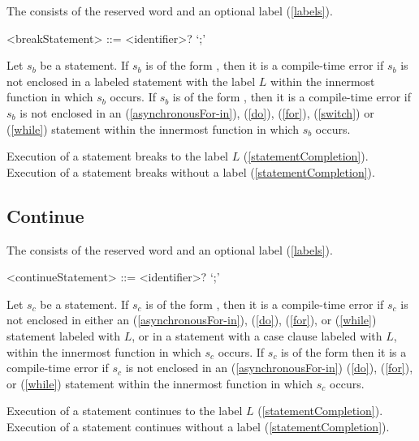 \documentclass[makeidx]{article}
\begin{document}
{\LMHash{}%
The  consists of
the reserved word \BREAK{} and an optional label (\ref{labels}).

\begin{grammar}
<breakStatement> ::= \BREAK{} <identifier>? `;'
\end{grammar}

\LMHash{}%
Let $s_b$ be a \BREAK{} statement.
If $s_b$ is of the form ,
then it is a compile-time error if $s_b$ is not enclosed in a labeled statement
with the label $L$ within the innermost function in which $s_b$ occurs.
If $s_b$ is of the form \code{\BREAK;},
then it is a compile-time error if $s_b$ is not enclosed in an
\code{\AWAIT{} \FOR} (\ref{asynchronousFor-in}),
\DO{} (\ref{do}), \FOR{} (\ref{for}), \SWITCH{} (\ref{switch})
or \WHILE{} (\ref{while}) statement within
the innermost function in which $s_b$ occurs.

\LMHash{}%
Execution of a \BREAK{} statement  breaks to the label $L$
(\ref{statementCompletion}).
Execution of a \BREAK{} statement \code{\BREAK;} breaks without a label
(\ref{statementCompletion}).


\subsection{Continue}

\LMHash{}%
The  consists of the reserved word \CONTINUE{}
and an optional label (\ref{labels}).

\begin{grammar}
<continueStatement> ::= \CONTINUE{} <identifier>? `;'
\end{grammar}

\LMHash{}%
Let $s_c$ be a \CONTINUE{} statement.
If $s_c$ is of the form ,
then it is a compile-time error if $s_c$ is not enclosed in either an
\code{\AWAIT{} \FOR} (\ref{asynchronousFor-in}),
\DO{} (\ref{do}), \FOR{} (\ref{for}), or \WHILE{} (\ref{while})
statement labeled with $L$, or in a \SWITCH{} statement with a case clause
labeled with $L$, within the innermost function in which $s_c$ occurs.
If $s_c$ is of the form \code{\CONTINUE;}
then it is a compile-time error if $s_c$ is not enclosed in an
\code{\AWAIT{} \FOR} (\ref{asynchronousFor-in})
\DO{} (\ref{do}), \FOR{} (\ref{for}), or \WHILE{} (\ref{while}) statement
within the innermost function in which $s_c$ occurs.

\LMHash{}%
Execution of a \CONTINUE{} statement  continues
to the label $L$ (\ref{statementCompletion}).
Execution of a \CONTINUE{} statement \code{\CONTINUE;} continues
without a label (\ref{statementCompletion}).


}
\end{document}
